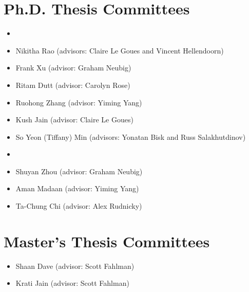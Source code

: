 \documentclass[11pt]{article}
\begin{document}
\section*{Ph.D. Thesis Committees}
\begin{itemize}
\item[]\hspace{-2.5em}{Current}
  \item Nikitha Rao (advisors: Claire Le Goues and Vincent Hellendoorn)
  \item Frank Xu (advisor: Graham Neubig)
  \item Ritam Dutt (advisor: Carolyn Rose)
  \item Ruohong Zhang (advisor: Yiming Yang)
	\item Kush Jain (advisor: Claire Le Goues)
	\item So Yeon (Tiffany) Min (advisors: Yonatan Bisk and Russ Salakhutdinov)
\item[]\hspace{-2.5em}{2024}
  \item Shuyan Zhou (advisor: Graham Neubig)
  \item Aman Madaan (advisor: Yiming Yang)
  \item Ta-Chung Chi (advisor: Alex Rudnicky)
\end{itemize}

\section*{Master's Thesis Committees}
\begin{itemize}
\item Shaan Dave (advisor: Scott Fahlman)
\item Krati Jain (advisor: Scott Fahlman)
\end{itemize}
\end{document}
